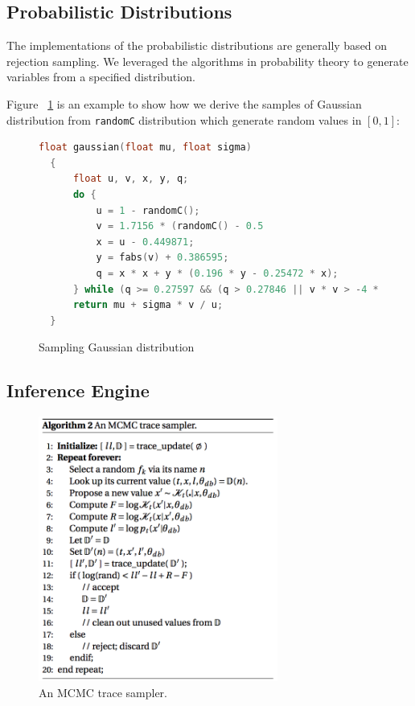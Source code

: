 \subsection{Probabilistic Distributions}
The implementations of the probabilistic distributions are generally based on rejection sampling. We leveraged the algorithms in probability theory to generate variables from a specified distribution.

Figure ~\ref{fig:gaussian} is an example to show how we derive the samples of Gaussian distribution from \texttt{randomC} distribution which generate random values in $[0, 1]$:

\begin{figure}
\begin{lstlisting}[language=C]
  float gaussian(float mu, float sigma)
  {
      float u, v, x, y, q;
      do {
          u = 1 - randomC();
          v = 1.7156 * (randomC() - 0.5
          x = u - 0.449871;
          y = fabs(v) + 0.386595;
          q = x * x + y * (0.196 * y - 0.25472 * x);
      } while (q >= 0.27597 && (q > 0.27846 || v * v > -4 * u * u * log(u)));
      return mu + sigma * v / u;
  }
\end{lstlisting}
\caption{Sampling Gaussian distribution}
\label{fig:gaussian}
\end{figure}

\subsection{Inference Engine}

\begin{figure}
    \centering
    \includegraphics[width=0.7\textwidth]{figures/trace1.png}
    \caption{An MCMC trace sampler.}
    \label{fig:trace1}
\end{figure}

